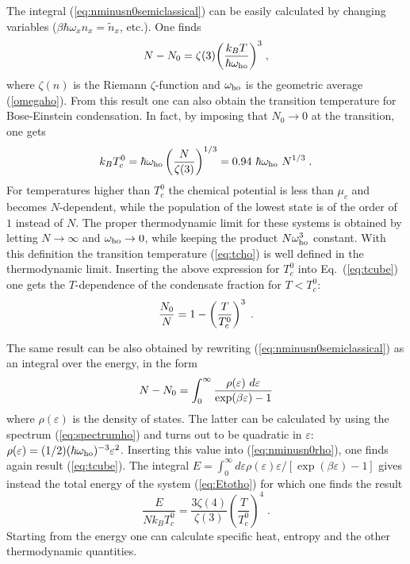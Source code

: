 The integral (\ref{eq:nminusn0semiclassical}) can be easily
calculated by changing variables ($\beta  \hbar \omega_x n_x
= \tilde{n}_x$, etc.).  One finds
\begin{equation}
N-N_0 =  \zeta(3) \bigg( {k_BT\over \hbar \omega_{\rm ho} }\bigg)^3 \; ,
\label{eq:tcube}
\end{equation}
where $\zeta(n)$ is the Riemann $\zeta$-function and $\omega_{\rm ho}$ is
the geometric average (\ref{omegaho}). From this
result one can also obtain the transition temperature for
Bose-Einstein condensation. In fact, by imposing that $N_0 \to 0$
at the transition, one gets
\begin{equation}
k_B T_c^0 = \hbar \omega_{\rm ho} \left( {N \over \zeta(3) } \right)^{1/3}
= 0.94 \ \hbar \omega_{\rm ho} \ N^{1/3} \; .
\label{eq:tcho}
\end{equation}
For temperatures higher than $T_c^0$ the chemical potential is less
than $\mu_c$ and becomes $N$-dependent, while the population of the lowest
state is of the order of $1$ instead of $N$.  The proper thermodynamic 
limit for these systems is obtained by letting $N\to\infty$ and 
$\omega_{\rm ho}\to 0$, while keeping the product $N \omega_{\rm ho}^3$ 
constant. With this definition the transition temperature (\ref{eq:tcho}) 
is well defined in the thermodynamic limit. Inserting the above expression 
for $T_c^0$ into Eq.~(\ref{eq:tcube}) one gets the $T$-dependence of 
the condensate fraction for $T < T_c^0$: 
\begin{equation}
{ N_0 \over N } = 1 - \left( { T \over T_c^0 } \right)^3 \; .
\label{eq:condfractioho}
\end{equation}

The same result can be also obtained by rewriting 
(\ref{eq:nminusn0semiclassical}) as an integral over the energy,
in the form
\begin{equation}
N - N_0 = \int_0^\infty {  \rho (\varepsilon) \ d\varepsilon 
\over \exp (\beta\varepsilon) - 1 }
\label{eq:nminusn0rho}
\end{equation}
where $\rho(\varepsilon)$ is the density of states. The latter
can be calculated by using the spectrum (\ref{eq:spectrumho}) and
turns out to be quadratic in $\varepsilon$:
$\rho (\varepsilon) =  (1/2) (\hbar \omega_{\rm ho})^{-3}
\varepsilon^2$. Inserting this value into (\ref{eq:nminusn0rho}),
one finds again result (\ref{eq:tcube}). The integral
$E=\int_0^\infty d\varepsilon\rho(\varepsilon)\varepsilon/[\exp(\beta
\varepsilon)-1]$ gives instead the total energy of the system
(\ref{eq:Etotho}) for which one finds
the result
\begin{equation}
\frac{E}{Nk_BT_c^0}=\frac{3\zeta(4)}{\zeta(3)}
\left(\frac{T}{T_c^0}\right)^4
\; .
\label{eq:Etothoperpart}
\end{equation}
Starting from the energy one can calculate specific heat, entropy 
and the other thermodynamic quantities.  

